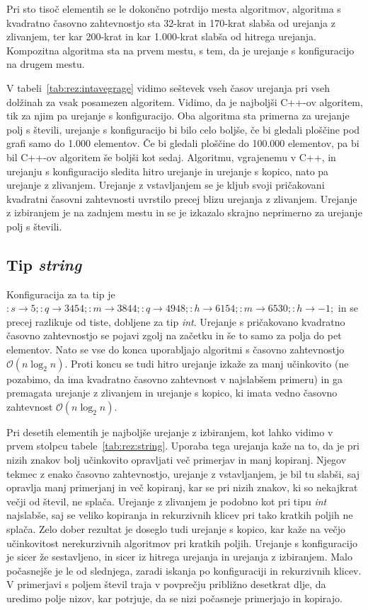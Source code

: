 \documentclass[a4paper,oneside,12pt]{article}
\newcommand{\lra}{\ensuremath{\longrightarrow}}
\begin{document}
Pri sto tisoč elementih se le dokončno potrdijo mesta algoritmov,
algoritma s kvadratno časovno zahtevnostjo sta 32-krat
in 170-krat slabša od urejanja z zlivanjem, ter kar 200-krat in kar 1.000-krat slabša od hitrega 
urejanja. Kompozitna algoritma sta na prvem mestu, s tem, da je urejanje s
konfiguracijo na drugem mestu.

V tabeli~\ref{tab:rez:intavegrage} vidimo seštevek vseh časov urejanja pri vseh
dolžinah za vsak posamezen algoritem. Vidimo, da je najboljši \mbox{C++-ov} algoritem,
tik za njim pa urejanje s konfiguracijo. Oba algoritma sta primerna za urejanje
polj s števili, urejanje s konfiguracijo bi bilo celo boljše, če bi gledali
ploščine pod grafi samo do 1.000 elementov. Če bi gledali ploščine do 100.000
elementov, pa bi bil \mbox{C++-ov} algoritem še boljši kot sedaj. 
Algoritmu, vgrajenemu v C++, in urejanju s konfiguracijo sledita hitro urejanje in urejanje
s kopico, nato pa urejanje z zlivanjem. Urejanje z vstavljanjem se je kljub svoji
pričakovani kvadratni časovni zahtevnosti uvrstilo precej blizu urejanja z
zlivanjem. Urejanje z izbiranjem je na zadnjem mestu in se je izkazalo skrajno 
neprimerno za urejanje polj s števili. 


\subsection{Tip \emph{string}}
Konfiguracija za ta tip je $:s \lra 5;:q \lra 3454;:m \lra 3844;:q \lra 4948;:h
\lra 6154;:m \lra 6530;:h \lra -1;$
in se precej razlikuje od tiste, dobljene za tip \emph{int}. Urejanje
s pričakovano kvadratno časovno zahtevnostjo se pojavi zgolj na začetku in še to samo za 
polja do pet elementov. Nato se vse do konca uporabljajo algoritmi s časovno zahtevnostjo 
$\mathcal{O}(n\log_2n)$. Proti koncu se tudi hitro urejanje izkaže za manj učinkovito (ne 
pozabimo, da ima kvadratno časovno zahtevnost v najslabšem primeru) in ga premagata urejanje
z zlivanjem in urejanje s kopico, ki imata vedno časovno zahtevnost $\mathcal{O}(n\log_2n)$. 

Pri desetih elementih je najboljše urejanje z izbiranjem, kot lahko vidimo v
prvem stolpcu tabele~\ref{tab:rez:string}.
Uporaba tega urejanja kaže na to, da je pri nizih znakov bolj učinkovito opravljati več
primerjav in manj kopiranj. Njegov tekmec z enako časovno zahtevnostjo, urejanje z 
vstavljanjem, je bil tu slabši, saj opravlja manj primerjanj in več kopiranj, kar se pri
nizih znakov, ki so nekajkrat večji od števil, ne splača. Urejanje z zlivanjem je podobno
kot pri tipu \emph{int} najslabše, saj se veliko kopiranja in rekurzivnih klicev pri tako 
kratkih poljih ne splača. Zelo dober rezultat je doseglo tudi urejanje s kopico, kar kaže 
na večjo učinkovitost nerekurzivnih algoritmov pri kratkih poljih. Urejanje s konfiguracijo
je sicer že sestavljeno, in sicer iz hitrega urejanja in urejanja z izbiranjem. Malo počasnejše 
je le od slednjega, zaradi iskanja po konfiguraciji in rekurzivnih klicev.
V primerjavi s poljem števil traja v povprečju približno desetkrat dlje, da uredimo polje nizov,
kar potrjuje, da se nizi počasneje primerjajo in kopirajo.
\end{document}
